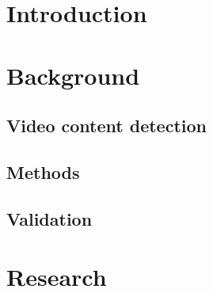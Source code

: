 \section{Introduction} \label{sec:intro}










\section{Background} \label{sec:background}

\subsection{Video content detection} \label{subsec:detection}

\subsection{Methods} \label{subsec:methods}

\subsection{Validation} \label{subsec:validation}

\section{Research} \label{sec:research}

